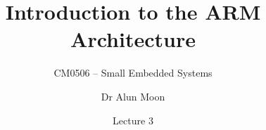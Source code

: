 \documentclass[svgnames,x11names]{beamer}
\title{Introduction to the ARM Architecture}
\subtitle{CM0506 -- Small Embedded Systems}
\date{Lecture 3}
\author{Dr Alun Moon}
\institute{Department of Computer and Information Science}
\begin{document}
\frame\maketitle

\end{document}

